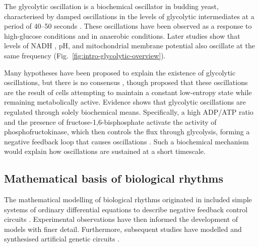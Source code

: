 The glycolytic oscillation is a biochemical oscillator in budding yeast, characterised by damped  oscillations in the levels of glycolytic intermediates at a period of 40--50 seconds  \parencite{ghoshOscillationsGlycolyticIntermediates1964}.
These oscillations have been observed as a response to high-glucose conditions and in anaerobic conditions.
Later studies show that levels of NADH \parencite{lloydSaccharomycesCerevisiaeOscillatory2019, olsenOscillationsYeastGlycolysis2021}, pH, and mitochondrial membrane potential \parencite{doddLiveCellImaging2017a} also oscillate at the same frequency (Fig.\ \ref{fig:intro-glycolytic-overview}).

Many hypotheses have been proposed to explain the existence of glycolytic oscillations, but there is no consensus \parencite{lloydSaccharomycesCerevisiaeOscillatory2019}, though \textcite{thokeConstantLowentropyProcess2018} proposed that these oscillations are the result of cells attempting to maintain a constant low-entropy state while remaining metabolically active.
Evidence shows that glycolytic oscillations are regulated through solely biochemical means.
Specifically, a high ADP/ATP ratio and the presence of fructose-1,6-bisphosphate activate the activity of phosphofructokinase, which then controls the flux through glycolysis, forming a negative feedback loop that causes oscillations \parencite{ghoshOscillationsGlycolyticIntermediates1964, higginsChemicalMechanismOscillation1964}.
Such a biochemical mechanism would explain how oscillations are sustained at a short timescale.

\subsection{Mathematical basis of biological rhythms}
\label{subsec:intro-biological_rhythms-theoretical_basis}

The mathematical modelling of biological rhythms originated in included simple systems of ordinary differential equations to describe negative feedback control circuits \parencite{goodwinOscillatoryBehaviorEnzymatic1965, griffithMathematicsCellularControl1968}.
Experimental observations have then informed the development of models with finer detail.
Furthermore, subsequent studies have modelled and synthesised artificial genetic circuits \parencite{elowitzSyntheticOscillatoryNetwork2000}.

